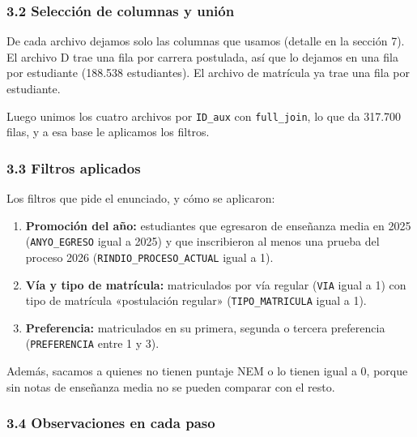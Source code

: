 \documentclass[11pt]{article}
\begin{document}
\subsubsection*{3.2 \; Selección de columnas y unión}

De cada archivo dejamos solo las columnas que usamos (detalle en la
sección 7). El archivo D trae una fila por carrera postulada, así que lo
dejamos en una fila por estudiante (188.538 estudiantes). El archivo de
matrícula ya trae una fila por estudiante.

Luego unimos los cuatro archivos por \texttt{ID\_aux} con
\texttt{full\_join}, lo que da 317.700 filas, y a esa base le aplicamos
los filtros.

\subsubsection*{3.3 \; Filtros aplicados}

Los filtros que pide el enunciado, y cómo se aplicaron:

\begin{enumerate}[leftmargin=1.5em, itemsep=0.3em, label=\textbf{\alph*)}]
  \item \textbf{Promoción del año:} estudiantes que egresaron de enseñanza
        media en 2025 (\texttt{ANYO\_EGRESO} igual a 2025) y que
        inscribieron al menos una prueba del proceso 2026
        (\texttt{RINDIO\_PROCESO\_ACTUAL} igual a 1).
  \item \textbf{Vía y tipo de matrícula:} matriculados por vía regular
        (\texttt{VIA} igual a 1) con tipo de matrícula «postulación
        regular» (\texttt{TIPO\_MATRICULA} igual a 1).
  \item \textbf{Preferencia:} matriculados en su primera, segunda o
        tercera preferencia (\texttt{PREFERENCIA} entre 1 y 3).
\end{enumerate}

Además, sacamos a quienes no tienen puntaje NEM o lo tienen igual a 0,
porque sin notas de enseñanza media no se pueden comparar con el resto.

\subsubsection*{3.4 \; Observaciones en cada paso}
\end{document}
